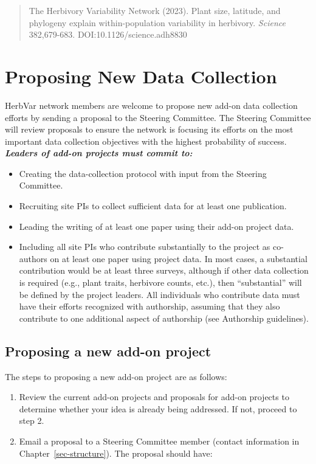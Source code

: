 \documentclass[
  letterpaper,
  oneside,
  open=any]{scrbook}
\providecommand{\tightlist}{%
  \setlength{\itemsep}{0pt}\setlength{\parskip}{0pt}}\usepackage{longtable,booktabs,array}
\begin{document}
\begin{quote}
The Herbivory Variability Network (2023). Plant size, latitude, and
phylogeny explain within-population variability in herbivory.
\emph{Science} 382,679-683. DOI:10.1126/science.adh8830
\end{quote}

\chapter{Proposing New Data Collection}\label{sec-new_data_collection}

HerbVar network members are welcome to propose new add-on data
collection efforts by sending a proposal to the Steering Committee. The
Steering Committee will review proposals to ensure the network is
focusing its efforts on the most important data collection objectives
with the highest probability of success. \textbf{\emph{Leaders of add-on
projects must commit to:}}

\begin{itemize}
\tightlist
\item
  Creating the data-collection protocol with input from the Steering
  Committee.
\item
  Recruiting site PIs to collect sufficient data for at least one
  publication.
\item
  Leading the writing of at least one paper using their add-on project
  data.
\item
  Including all site PIs who contribute substantially to the project as
  co-authors on at least one paper using project data. In most cases, a
  substantial contribution would be at least three surveys, although if
  other data collection is required (e.g., plant traits, herbivore
  counts, etc.), then ``substantial'' will be defined by the project
  leaders. All individuals who contribute data must have their efforts
  recognized with authorship, assuming that they also contribute to one
  additional aspect of authorship (see Authorship guidelines).
\end{itemize}

\section{Proposing a new add-on
project}\label{proposing-a-new-add-on-project}

The steps to proposing a new add-on project are as follows:

\begin{enumerate}
\def\labelenumi{\arabic{enumi}.}
\item
  Review the current add-on projects and proposals for add-on projects
  to determine whether your idea is already being addressed. If not,
  proceed to step 2.
\item
  Email a proposal to a Steering Committee member (contact information
  in Chapter~\ref{sec-structure}). The proposal should have:
\end{enumerate}
\end{document}
